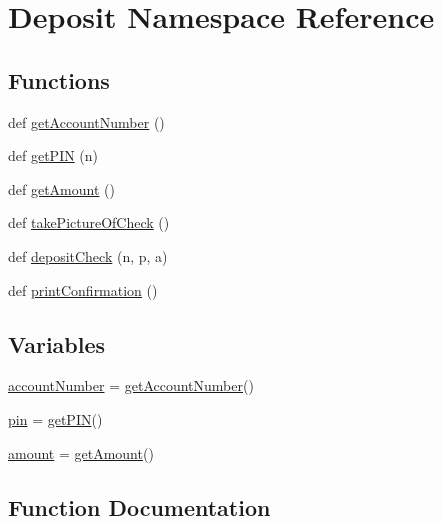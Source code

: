 \hypertarget{namespaceDeposit}{}\section{Deposit Namespace Reference}
\label{namespaceDeposit}
\subsection*{Functions}
\begin{DoxyCompactItemize}
\item 
def \hyperlink{namespaceDeposit_a5550db47d340cfbf8da0504fdbb4bd38}{get\+Account\+Number} ()
\item 
def \hyperlink{namespaceDeposit_aeb2bde95c577d37691610d458bba8d96}{get\+P\+IN} (n)
\item 
def \hyperlink{namespaceDeposit_a1980b46e5ca4ad7fe16e06703b568f78}{get\+Amount} ()
\item 
def \hyperlink{namespaceDeposit_ae5cbbb64bef92d28ac3283006f0ac72c}{take\+Picture\+Of\+Check} ()
\item 
def \hyperlink{namespaceDeposit_ae9c9febfed3a8d6ad618d2c123df4b77}{deposit\+Check} (n, p, a)
\item 
def \hyperlink{namespaceDeposit_a7d4afe0289e672f39e4951c790cf8927}{print\+Confirmation} ()
\end{DoxyCompactItemize}
\subsection*{Variables}
\begin{DoxyCompactItemize}
\item 
\hyperlink{namespaceDeposit_a266a490bcb8b7e116e4e7258429aabe5}{account\+Number} = \hyperlink{namespaceDeposit_a5550db47d340cfbf8da0504fdbb4bd38}{get\+Account\+Number}()
\item 
\hyperlink{namespaceDeposit_a5ae26ec6c68e4031fbb50c9b0b15daf7}{pin} = \hyperlink{namespaceDeposit_aeb2bde95c577d37691610d458bba8d96}{get\+P\+IN}()
\item 
\hyperlink{namespaceDeposit_a903d2b091ff78ff14bb2e0e6b002de77}{amount} = \hyperlink{namespaceDeposit_a1980b46e5ca4ad7fe16e06703b568f78}{get\+Amount}()
\end{DoxyCompactItemize}


\subsection{Function Documentation}
